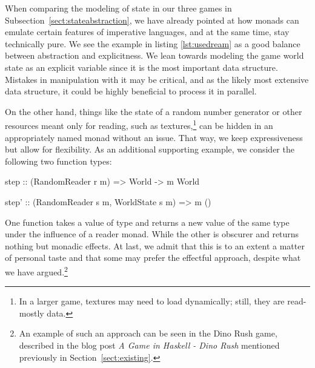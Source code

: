 \documentclass[
  digital, %
  color,   %
  table,   %
  oneside, %
  lof,     %
  lot,     %
]{fithesis3}
\begin{document}
{When comparing the modeling of state in our three games in Subsection~\ref{sect:stateabstraction},
we have already pointed at how monads can emulate certain features of imperative languages,
and at the same time, stay technically pure.\footnotemark{} We see the example in listing
\ref{lst:usedream} as a good balance between abstraction and explicitness.
We lean towards modeling the game world state as an explicit variable since it is
the most important data structure. Mistakes in manipulation with it may be critical,
and as the likely most extensive data structure,
it could be highly beneficial to process it in parallel.


On the other hand, things like the state of a random number generator or other resources
meant only for reading, such as textures,\footnote{
In a larger game, textures may need to load dynamically; still, they are read-mostly data.
}
can be hidden in an appropriately named monad without an issue.
That way, we keep expressiveness but allow for flexibility.
As an additional supporting example, we consider the following two function types:
\begin{haskell}
step :: (RandomReader r m) => World -> m World

step' :: (RandomReader s m, WorldState s m) => m ()
\end{haskell}
One function takes a value of type  and returns
a new value of the same type under the influence of a reader monad.
While the other is obscurer and returns nothing but monadic effects.
At last, we admit that this is to an extent a matter of personal taste
and that some may prefer the effectful approach, despite what we have argued.\footnote{
An example of such an approach can be seen in the Dino Rush game,
described in the blog post \emph{A Game in Haskell - Dino Rush}\cite{dinorush} mentioned
previously in Section~\ref{sect:existing}.
}





}
\end{document}
